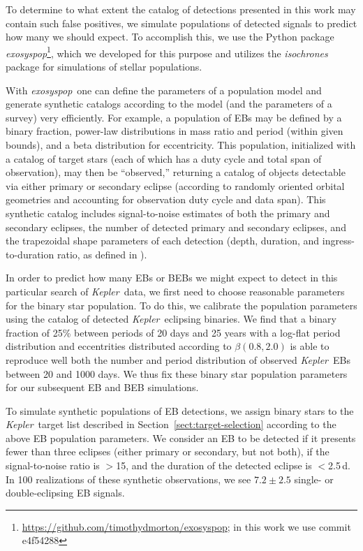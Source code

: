 \documentclass[manuscript, letterpaper]{aastex6}
\newcommand{\project}[1]{\textsl{#1}}
\newcommand{\kepler}{\project{Kepler}}
\newcommand{\exosyspop}{\project{exosyspop}}
\newcommand{\sectionname}{Section}
\newcommand{\sectref}[1]{\ref{sect:#1}}
\newcommand{\Sect}[1]{\sectionname~\sectref{#1}}
\newcommand{\sect}[1]{\Sect{#1}}
\begin{document}
To determine to what extent the catalog of detections presented in this work
may contain such false positives, we simulate populations of detected signals
to predict how many we should expect.  To accomplish this, we use the Python
package
\exosyspop\footnote{\url{https://github.com/timothydmorton/exosyspop}; in this
work we use commit \textsf{e4f54288}}, which
we developed for this purpose and utilizes the \project{isochrones}
package \citep{Morton:2015} for simulations of stellar populations.

With \exosyspop\, one can define the parameters of a population model and
generate synthetic catalogs according to the model (and the parameters of a
survey) very efficiently.  For example, a population of EBs may be defined by
a binary fraction, power-law distributions in mass ratio and period (within
given bounds), and a beta distribution for eccentricity.  This population,
initialized with a catalog of target stars (each of which has a duty cycle and
total span of observation), may then be ``observed,'' returning a catalog of
objects detectable via either primary or secondary eclipse (according to
randomly oriented orbital geometries and accounting for observation duty cycle
and data span).  This synthetic catalog includes signal-to-noise estimates of
both the primary and secondary eclipses, the number of detected primary and
secondary eclipses, and the trapezoidal shape parameters of each detection
(depth, duration, and ingress-to-duration ratio, as defined in
\citealt{Morton:2012}).

In order to predict how many EBs or BEBs we might expect to detect in this
particular search of \kepler\ data, we first need to choose reasonable parameters
for the binary star population.  To do this, we calibrate the population
parameters using the catalog of detected \kepler\ eclipsing binaries.  We
find that a binary fraction of 25\% between periods of 20 days and 25 years with
a log-flat period distribution and eccentrities distributed according
to $\beta(0.8, 2.0)$ is able to reproduce well both the number and period
distribution of observed \kepler\ EBs between 20 and 1000 days.  We thus fix these
binary star population parameters for our subsequent EB and BEB simulations.

To simulate synthetic populations of EB detections, we assign binary stars  to
the \kepler\ target list described in \sect{target-selection} according to the
above EB population parameters.  We consider an EB to be detected if it
presents fewer than three eclipses (either primary or secondary, but not
both), if the signal-to-noise ratio is $>$15, and the duration of the
detected eclipse is $<$2.5\,d.  In 100 realizations of these synthetic
observations, we see $7.2 \pm 2.5$ single- or double-eclipsing EB signals.
\end{document}
